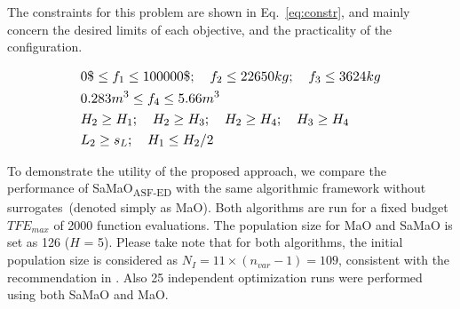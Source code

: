 \documentclass[twocolumn,10pt]{asme2ej}
\begin{document}
The constraints for this problem are shown in Eq.~\ref{eq:constr}, and mainly concern the desired limits of each objective, and the practicality of the configuration. 

\begin{equation}\footnotesize
\begin{aligned}
& 0 \$ \le f_1 \le 100000 \$; \quad f_2 \le 22650 kg; \quad f_3 \le 3624 kg \\
& 0.283 m^3 \le f_4 \le 5.66 m^3 \\
& H_2 \ge H_1; \quad H_2 \ge H_3; \quad H_2 \ge H_4; \quad H_3 \ge H_4 \\ 
&L_2 \ge s_L; \quad H_1 \le H_2/2 \\
\end{aligned}
\label{eq:constr}
\end{equation}
{\color{blue}
To demonstrate the utility of the proposed approach, we compare the performance of SaMaO\textsubscript{ASF-ED} with the same algorithmic framework without surrogates~(denoted simply as MaO). Both algorithms are run for a fixed budget $TFE_{max}$ of 2000 function evaluations. The population size for MaO and SaMaO is set as 126 ($H$ = 5). Please take note that for both algorithms, the initial population size is considered as $N_I = 11 \times (n_{var} - 1) = 109$, consistent with the recommendation in \cite{KHTchugh2016krvea}. Also 25 independent optimization runs were performed using both SaMaO and MaO.   

}
\end{document}

